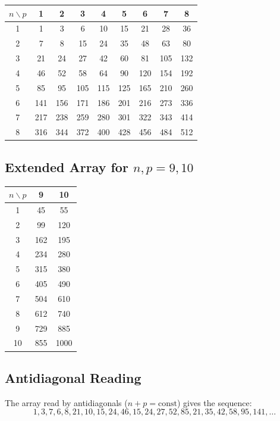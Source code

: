 \documentclass[11pt,a4paper]{article}
\theoremstyle{definition}
\begin{document}
\begin{center}
\begin{tabular}{c|cccccccc}
\toprule
$n \backslash p$ & 1 & 2 & 3 & 4 & 5 & 6 & 7 & 8 \\
\midrule
1 & 1 & 3 & 6 & 10 & 15 & 21 & 28 & 36 \\
2 & 7 & 8 & 15 & 24 & 35 & 48 & 63 & 80 \\
3 & 21 & 24 & 27 & 42 & 60 & 81 & 105 & 132 \\
4 & 46 & 52 & 58 & 64 & 90 & 120 & 154 & 192 \\
5 & 85 & 95 & 105 & 115 & 125 & 165 & 210 & 260 \\
6 & 141 & 156 & 171 & 186 & 201 & 216 & 273 & 336 \\
7 & 217 & 238 & 259 & 280 & 301 & 322 & 343 & 414 \\
8 & 316 & 344 & 372 & 400 & 428 & 456 & 484 & 512 \\
\bottomrule
\end{tabular}
\end{center}

\subsection{Extended Array for $n, p = 9, 10$}

\begin{center}
\begin{tabular}{c|cc}
\toprule
$n \backslash p$ & 9 & 10 \\
\midrule
1 & 45 & 55 \\
2 & 99 & 120 \\
3 & 162 & 195 \\
4 & 234 & 280 \\
5 & 315 & 380 \\
6 & 405 & 490 \\
7 & 504 & 610 \\
8 & 612 & 740 \\
9 & 729 & 885 \\
10 & 855 & 1000 \\
\bottomrule
\end{tabular}
\end{center}

\subsection{Antidiagonal Reading}

The array read by antidiagonals ($n + p = \text{const}$) gives the sequence:
\[
1, 3, 7, 6, 8, 21, 10, 15, 24, 46, 15, 24, 27, 52, 85, 21, 35, 42, 58, 95, 141, \ldots
\]
\end{document}
